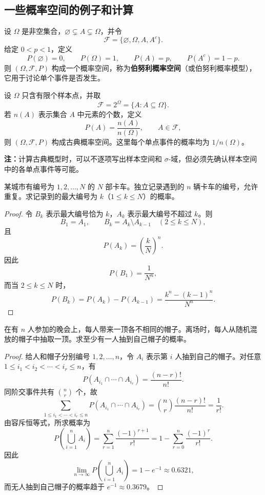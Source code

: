 \subsection*{一些概率空间的例子和计算}

\begin{example}[伯努利概率空间]
设 $\Omega$ 是非空集合，$\varnothing\subsetneq A\subsetneq\Omega$，并令
\[
\mathscr{F}=\{\varnothing,\Omega,A,A^c\}.
\]
给定 $0<p<1$，定义
\[
P(\varnothing)=0,\qquad P(\Omega)=1,
\qquad P(A)=p,\qquad P(A^c)=1-p.
\]
则 $(\Omega,\mathscr{F},P)$ 构成一个概率空间，称为\textbf{伯努利概率空间}（或伯努利概率模型），它用于讨论单个事件是否发生。
\end{example}

\begin{example}[古典概率空间]
设 $\Omega$ 只含有限个样本点，并取
\[
\mathscr{F}=2^\Omega=\{A:A\subseteq\Omega\}.
\]
若 $n(A)$ 表示集合 $A$ 中元素的个数，定义
\[
P(A)=\frac{n(A)}{n(\Omega)},\qquad A\in\mathscr{F},
\]
则 $(\Omega,\mathscr{F},P)$ 构成古典概率空间。这里每个单点事件的概率均为 $1/n(\Omega)$。
\end{example}

\textbf{注：}计算古典概型时，可以不逐项写出样本空间和 $\sigma$-域，但必须先确认样本空间中的各单点事件等可能。

\begin{example}[最大号码问题]
某城市有编号为 $1,2,\ldots,N$ 的 $N$ 部卡车。独立记录遇到的 $n$ 辆卡车的编号，允许重复。求记录到的最大编号为 $k$（$1\leq k\leq N$）的概率。
\end{example}

\begin{proof}
令 $B_k$ 表示最大编号恰为 $k$，$A_k$ 表示最大编号不超过 $k$。则
\[
B_1=A_1,\qquad B_k=A_k\setminus A_{k-1}\quad(2\leq k\leq N),
\]
且
\[
P(A_k)=\left(\frac{k}{N}\right)^n.
\]
因此
\[
P(B_1)=\frac{1}{N^n},
\]
而当 $2\leq k\leq N$ 时，
\[
P(B_k)=P(A_k)-P(A_{k-1})
=\frac{k^n-(k-1)^n}{N^n}.
\]

\end{proof}

\begin{example}[配对问题]
在有 $n$ 人参加的晚会上，每人带来一顶各不相同的帽子。离场时，每人从随机混放的帽子中抽取一顶。求至少有一人抽到自己帽子的概率。
\end{example}

\begin{proof}
给人和帽子分别编号 $1,2,\ldots,n$，令 $A_i$ 表示第 $i$ 人抽到自己的帽子。对任意
$1\leq i_1<i_2<\cdots<i_r\leq n$，有
\[
P(A_{i_1}\cap\cdots\cap A_{i_r})=\frac{(n-r)!}{n!}.
\]
同阶交事件共有 $\binom{n}{r}$ 个，故
\[
\sum_{1\leq i_1<\cdots<i_r\leq n}
P(A_{i_1}\cap\cdots\cap A_{i_r})
=\binom{n}{r}\frac{(n-r)!}{n!}=\frac{1}{r!}.
\]
由容斥恒等式，所求概率为
\[
P\left(\bigcup_{i=1}^{n}A_i\right)
=\sum_{r=1}^{n}\frac{(-1)^{r+1}}{r!}
=1-\sum_{r=0}^{n}\frac{(-1)^r}{r!}.
\]
因此
\[
\lim_{n\to\infty}P\left(\bigcup_{i=1}^{n}A_i\right)
=1-e^{-1}\approx0.6321,
\]
而无人抽到自己帽子的概率趋于 $e^{-1}\approx0.3679$。
\end{proof}

